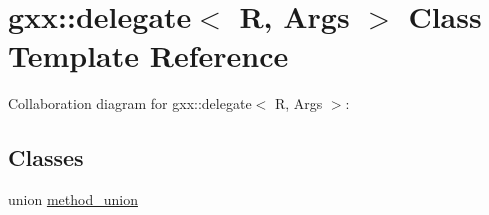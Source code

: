 \hypertarget{classgxx_1_1delegate}{}\section{gxx\+:\+:delegate$<$ R, Args $>$ Class Template Reference}
\label{classgxx_1_1delegate}


Collaboration diagram for gxx\+:\+:delegate$<$ R, Args $>$\+:
\subsection*{Classes}
\begin{DoxyCompactItemize}
\item 
union \hyperlink{uniongxx_1_1delegate_1_1method__union}{method\+\_\+union}
\end{DoxyCompactItemize}
